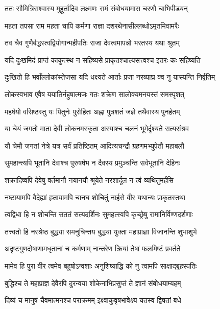 \twolineshloka
{ततः सौमित्रिराश्वास्य मुहूर्तादिव लक्ष्मणः}
{रामं संबोधयामास चरणौ चाभिपीडयन्} %

\twolineshloka
{महता तपसा राम महता चापि कर्मणा}
{राज्ञा दशरथेनासील्लब्धोऽमृतमिवामरैः} %

\twolineshloka
{तव चैव गुणैर्बद्धस्त्वद्वियोगान्महीपतिः}
{राजा देवत्वमापन्नो भरतस्य यथा श्रुतम्} %

\twolineshloka
{यदि दुःखमिदं प्राप्तं काकुत्स्थ न सहिष्यसे}
{प्राकृतश्चाल्पसत्त्वश्च इतरः कः सहिष्यति} %

\twolineshloka
{दुःखितो हि भवाँल्लोकांस्तेजसा यदि धक्ष्यते}
{आर्ताः प्रजा नरव्याघ्र क्व नु यास्यन्ति निर्वृतिम्} %

\twolineshloka
{लोकस्वभाव एवैष ययातिर्नहुषात्मजः}
{गतः शक्रेण सालोक्यमनयस्तं समस्पृशत्} %

\twolineshloka
{महर्षयो वसिष्ठस्तु यः पितुर्नः पुरोहितः}
{अह्ना पुत्रशतं जज्ञे तथैवास्य पुनर्हतम्} %

\twolineshloka
{या चेयं जगतो माता देवी लोकनमस्कृता}
{अस्याश्च चलनं भूमेर्दृश्यते सत्यसंश्रव} %

\twolineshloka
{यौ चेमौ जगतां नेत्रे यत्र सर्वं प्रतिष्ठितम्}
{आदित्यचन्द्रौ ग्रहणमभ्युपेतौ महाबलौ} %

\twolineshloka
{सुमहान्त्यपि भूतानि देवाश्च पुरुषर्षभ}
{न दैवस्य प्रमुञ्चन्ति सर्वभूतानि देहिनः} %

\twolineshloka
{शक्रादिष्वपि देवेषु वर्तमानौ नयानयौ}
{श्रूयेते नरशार्दूल न त्वं व्यथितुमर्हसि} %

\twolineshloka
{नष्टायामपि वैदेह्यां हृतायामपि चानघ}
{शोचितुं नार्हसे वीर यथान्यः प्राकृतस्तथा} %

\twolineshloka
{त्वद्विधा हि न शोचन्ति सततं सत्यदर्शिनः}
{सुमहत्स्वपि कृच्छ्रेषु रामानिर्विण्णदर्शणाः} %

\twolineshloka
{तत्त्वतो हि नरश्रेष्ठ बुद्ध्या समनुचिन्तय}
{बुद्ध्या युक्ता महाप्राज्ञा विजानन्ति शुभाशुभे} %

\twolineshloka
{अदृष्टगुणदोषाणामधृतानां च कर्मणाम्}
{नान्तरेण क्रियां तेषां फलमिष्टं प्रवर्तते} %

\twolineshloka
{मामेव हि पुरा वीर त्वमेव बहुषोऽन्वशाः}
{अनुशिष्याद्धि को नु त्वामपि साक्षाद्बृहस्पतिः} %

\twolineshloka
{बुद्धिश्च ते महाप्राज्ञ देवैरपि दुरन्वया}
{शोकेनाभिप्रसुप्तं ते ज्ञानं संबोधयाम्यहम्} %

\twolineshloka
{दिव्यं च मानुषं चैवमात्मनश्च पराक्रमम्}
{इक्ष्वाकुवृषभावेक्ष्य यतस्व द्विषतां बधे} %

